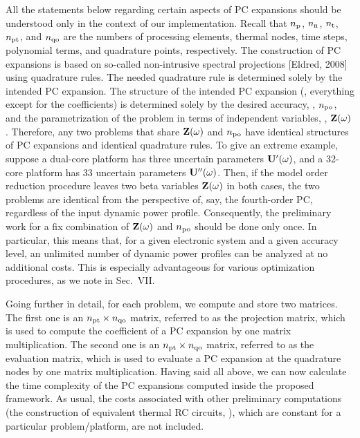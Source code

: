 \begin{authors}
All the statements below regarding certain aspects of PC expansions should be understood only in the context of our implementation.
Recall that ${n_\text{p}}$, ${n_\text{n}}$, ${n_\text{t}}$, ${n_\text{pt}}$, and ${n_\text{qo}}$ are the numbers of processing elements, thermal nodes, time steps, polynomial terms, and quadrature points, respectively.
The construction of PC expansions is based on so-called non-intrusive spectral projections [Eldred, 2008] using quadrature rules.
The needed quadrature rule is determined solely by the intended PC expansion.
The structure of the intended PC expansion (\ie, everything except for the coefficients) is determined solely by the desired accuracy, \ie, ${n_\text{po}}$, and the parametrization of the problem in terms of independent variables, \ie, $\mathbf{Z}(\omega)$.
Therefore, any two problems that share $\mathbf{Z}(\omega)$ and ${n_\text{po}}$ have identical structures of PC expansions and identical quadrature rules.
To give an extreme example, suppose a dual-core platform has three uncertain parameters $\mathbf{U}'(\omega)$, and a 32-core platform has 33 uncertain parameters $\mathbf{U}''(\omega)$.
Then, if the model order reduction procedure leaves two beta variables $\mathbf{Z}(\omega)$ in both cases, the two problems are identical from the perspective of, say, the fourth-order PC, regardless of the input dynamic power profile.
Consequently, the preliminary work for a fix combination of $\mathbf{Z}(\omega)$ and ${n_\text{po}}$ should be done only once.
In particular, this means that, for a given electronic system and a given accuracy level, an unlimited number of dynamic power profiles can be analyzed at no additional costs.
This is especially advantageous for various optimization procedures, as we note in Sec.~VII.

Going further in detail, for each problem, we compute and store two matrices.
The first one is an ${n_\text{pt}} \times {n_\text{qo}}$ matrix, referred to as the projection matrix, which is used to compute the coefficient of a PC expansion by one matrix multiplication.
The second one is an ${n_\text{pt}} \times {n_\text{qo}}$ matrix, referred to as the evaluation matrix, which is used to evaluate a PC expansion at the quadrature nodes by one matrix multiplication.
Having said all above, we can now calculate the time complexity of the PC expansions computed inside the proposed framework.
As usual, the costs associated with other preliminary computations (the construction of equivalent thermal RC circuits, \etc), which are constant for a particular problem/platform, are not included.


\end{authors}
